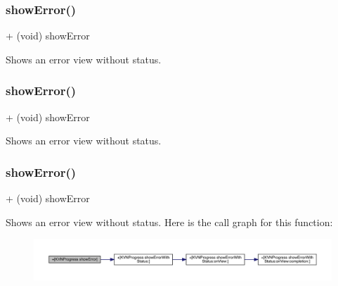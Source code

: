 \subsubsection{\texorpdfstring{show\+Error()}{showError()}\hspace{0.1cm}{\footnotesize\ttfamily [1/3]}}
{\footnotesize\ttfamily + (void) show\+Error \begin{DoxyParamCaption}{ }\end{DoxyParamCaption}}

Shows an error view without status. \mbox{\label{interface_k_v_n_progress_aca67ff95ae9a6d0ad5237fdc1d5dd34c}} 
\subsubsection{\texorpdfstring{show\+Error()}{showError()}\hspace{0.1cm}{\footnotesize\ttfamily [2/3]}}
{\footnotesize\ttfamily + (void) show\+Error \begin{DoxyParamCaption}{ }\end{DoxyParamCaption}}

Shows an error view without status. \mbox{\label{interface_k_v_n_progress_aca67ff95ae9a6d0ad5237fdc1d5dd34c}} 
\subsubsection{\texorpdfstring{show\+Error()}{showError()}\hspace{0.1cm}{\footnotesize\ttfamily [3/3]}}
{\footnotesize\ttfamily + (void) show\+Error \begin{DoxyParamCaption}{ }\end{DoxyParamCaption}}

Shows an error view without status. Here is the call graph for this function\+:\nopagebreak
\begin{figure}[H]
\begin{center}
\leavevmode
\includegraphics[width=350pt]{interface_k_v_n_progress_aca67ff95ae9a6d0ad5237fdc1d5dd34c_cgraph}
\end{center}
\end{figure}
\mbox{\label{interface_k_v_n_progress_a9de6833483cb5bd061d150e8fb42e5f8}} 
